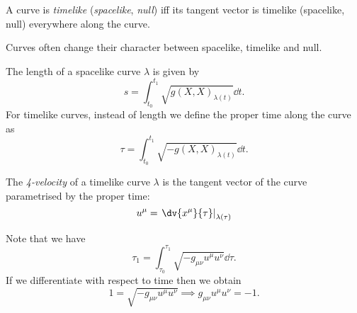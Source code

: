 \documentclass{jknotes}
\begin{document}
\begin{defn}
    A curve is \emph{timelike} (\emph{spacelike}, \emph{null}) iff its tangent vector is timelike (spacelike, null) everywhere along the curve.
\end{defn}
Curves often change their character between spacelike, timelike and null.

The length of a spacelike curve \(\lambda\) is given by
\begin{equation}
    s = \int_{t_0}^{t_1} \sqrt{g(X,X)_{\lambda(t)}} \dd{t}.
\end{equation}
For timelike curves, instead of length we define the proper time along the curve as
\begin{equation}
    \tau = \int_{t_0}^{t_1} \sqrt{-g(X,X)_{\lambda(t)}} \dd{t}.
\end{equation}

\begin{defn}
    The \emph{4-velocity} of a timelike curve \(\lambda\) is the tangent vector of the curve parametrised by the proper time:
    \begin{equation}
        u^\mu = \left.\dv{x^\mu}{\tau}\right|_{\lambda(\tau)}
    \end{equation}
\end{defn}

Note that we have
\begin{equation}
    \tau_1 = \int^{\tau_1}_{\tau_0} \sqrt{-g_{\mu\nu} u^\mu u^\nu} \dd{\tau}.
\end{equation}
If we differentiate with respect to time then we obtain
\begin{equation}
    1 = \sqrt{-g_{\mu\nu}u^\mu u^\nu} \implies g_{\mu\nu}u^\mu u^\nu = -1.
\end{equation}
\end{document}
